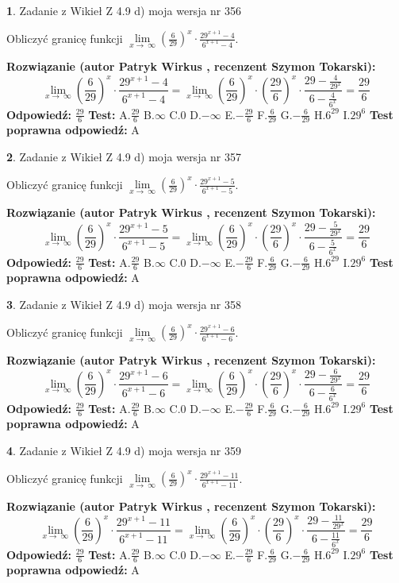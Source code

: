 \documentclass[12pt, a4paper]{article}
\theoremstyle{definition} %
\newtheorem{zad}{}
\newcommand{\zadStart}[1]{\begin{zad}#1\newline}
\newcommand{\zadStop}{\end{zad}}
\newcommand{\rozwStart}[2]{\noindent \textbf{Rozwiązanie (autor #1 , recenzent #2): }\newline}
\newcommand{\rozwStop}{\newline}
\newcommand{\odpStart}{\noindent \textbf{Odpowiedź:}\newline}
\newcommand{\odpStop}{\newline}
\newcommand{\testStart}{\noindent \textbf{Test:}\newline}
\newcommand{\testStop}{\newline}
\newcommand{\kluczStart}{\noindent \textbf{Test poprawna odpowiedź:}\newline}
\newcommand{\kluczStop}{\newline}
\begin{document}
\zadStart{Zadanie z Wikieł Z 4.9 d) moja wersja nr 356}


Obliczyć granicę funkcji  $\lim\limits_{x\to\ \infty}(\frac{6}{29})^{x}\cdot\frac{29^{x+1}-4}{6^{x+1}-4}$.
\zadStop
\rozwStart{Patryk Wirkus}{Szymon Tokarski}
$$\lim\limits_{x\to\ \infty}(\frac{6}{29})^{x}\cdot\frac{29^{x+1}-4}{6^{x+1}-4}=\lim\limits_{x\to\ \infty}(\frac{6}{29})^{x}\cdot(\frac{29}{6})^{x} \cdot \frac{29-\frac{4}{29^{x}}}{6-\frac{4}{6^{x}}} = \frac{29}{6}$$
\rozwStop
\odpStart
$\frac{29}{6}$
\odpStop
\testStart
A.$\frac{29}{6}$ B.$\infty$ C.$0$ D.$-\infty$ E.$-\frac{29}{6}$
F.$\frac{6}{29}$ G.$-\frac{6}{29}$
H.$6^{29}$
I.$29^{6}$
\testStop
\kluczStart
A
\kluczStop



\zadStart{Zadanie z Wikieł Z 4.9 d) moja wersja nr 357}


Obliczyć granicę funkcji  $\lim\limits_{x\to\ \infty}(\frac{6}{29})^{x}\cdot\frac{29^{x+1}-5}{6^{x+1}-5}$.
\zadStop
\rozwStart{Patryk Wirkus}{Szymon Tokarski}
$$\lim\limits_{x\to\ \infty}(\frac{6}{29})^{x}\cdot\frac{29^{x+1}-5}{6^{x+1}-5}=\lim\limits_{x\to\ \infty}(\frac{6}{29})^{x}\cdot(\frac{29}{6})^{x} \cdot \frac{29-\frac{5}{29^{x}}}{6-\frac{5}{6^{x}}} = \frac{29}{6}$$
\rozwStop
\odpStart
$\frac{29}{6}$
\odpStop
\testStart
A.$\frac{29}{6}$ B.$\infty$ C.$0$ D.$-\infty$ E.$-\frac{29}{6}$
F.$\frac{6}{29}$ G.$-\frac{6}{29}$
H.$6^{29}$
I.$29^{6}$
\testStop
\kluczStart
A
\kluczStop



\zadStart{Zadanie z Wikieł Z 4.9 d) moja wersja nr 358}


Obliczyć granicę funkcji  $\lim\limits_{x\to\ \infty}(\frac{6}{29})^{x}\cdot\frac{29^{x+1}-6}{6^{x+1}-6}$.
\zadStop
\rozwStart{Patryk Wirkus}{Szymon Tokarski}
$$\lim\limits_{x\to\ \infty}(\frac{6}{29})^{x}\cdot\frac{29^{x+1}-6}{6^{x+1}-6}=\lim\limits_{x\to\ \infty}(\frac{6}{29})^{x}\cdot(\frac{29}{6})^{x} \cdot \frac{29-\frac{6}{29^{x}}}{6-\frac{6}{6^{x}}} = \frac{29}{6}$$
\rozwStop
\odpStart
$\frac{29}{6}$
\odpStop
\testStart
A.$\frac{29}{6}$ B.$\infty$ C.$0$ D.$-\infty$ E.$-\frac{29}{6}$
F.$\frac{6}{29}$ G.$-\frac{6}{29}$
H.$6^{29}$
I.$29^{6}$
\testStop
\kluczStart
A
\kluczStop



\zadStart{Zadanie z Wikieł Z 4.9 d) moja wersja nr 359}


Obliczyć granicę funkcji  $\lim\limits_{x\to\ \infty}(\frac{6}{29})^{x}\cdot\frac{29^{x+1}-11}{6^{x+1}-11}$.
\zadStop
\rozwStart{Patryk Wirkus}{Szymon Tokarski}
$$\lim\limits_{x\to\ \infty}(\frac{6}{29})^{x}\cdot\frac{29^{x+1}-11}{6^{x+1}-11}=\lim\limits_{x\to\ \infty}(\frac{6}{29})^{x}\cdot(\frac{29}{6})^{x} \cdot \frac{29-\frac{11}{29^{x}}}{6-\frac{11}{6^{x}}} = \frac{29}{6}$$
\rozwStop
\odpStart
$\frac{29}{6}$
\odpStop
\testStart
A.$\frac{29}{6}$ B.$\infty$ C.$0$ D.$-\infty$ E.$-\frac{29}{6}$
F.$\frac{6}{29}$ G.$-\frac{6}{29}$
H.$6^{29}$
I.$29^{6}$
\testStop
\kluczStart
A
\kluczStop
\end{document}
